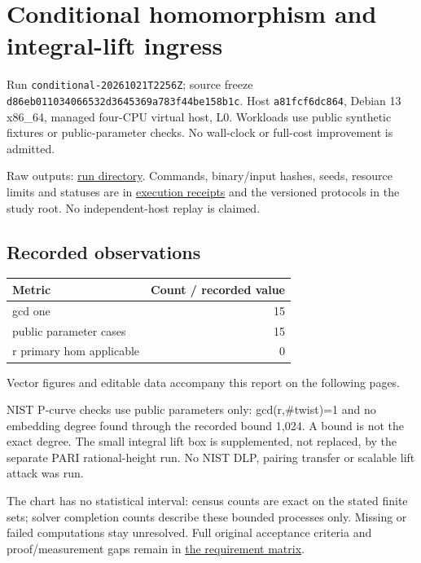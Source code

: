 \documentclass[
  10pt,
  letterpaper,
  landscape]{article}
\author{}
\date{}
\begin{document}
\section{Conditional homomorphism and integral-lift
ingress}\label{conditional-homomorphism-and-integral-lift-ingress}

Run \texttt{conditional-20261021T2256Z}; source freeze
\texttt{d86eb011034066532d3645369a783f44be158b1c}. Host
\texttt{a81fcf6dc864}, Debian 13 x86\_64, managed four-CPU virtual host,
L0. Workloads use public synthetic fixtures or public-parameter checks.
No wall-clock or full-cost improvement is admitted.

Raw outputs:
\href{../../../execution-v1/runs/conditional-20261021T2256Z/}{run
directory}. Commands, binary/input hashes, seeds, resource limits and
statuses are in \href{../../../execution-v1/}{execution receipts} and
the versioned protocols in the study root. No independent-host replay is
claimed.

\subsection{Recorded observations}\label{recorded-observations}

\begin{longtable}[]{@{}lr@{}}
\toprule\noalign{}
Metric & Count / recorded value \\
\midrule\noalign{}
\endhead
\bottomrule\noalign{}
\endlastfoot
gcd one & 15 \\
public parameter cases & 15 \\
r primary hom applicable & 0 \\
\end{longtable}

Vector figures and editable data accompany this report on the following pages.

NIST P-curve checks use public parameters only: gcd(r,\#twist)=1 and no
embedding degree found through the recorded bound 1,024. A bound is not
the exact degree. The small integral lift box is supplemented, not
replaced, by the separate PARI rational-height run. No NIST DLP, pairing
transfer or scalable lift attack was run.

The chart has no statistical interval: census counts are exact on the
stated finite sets; solver completion counts describe these bounded
processes only. Missing or failed computations stay unresolved. Full
original acceptance criteria and proof/measurement gaps remain in
\href{../../../EXPERIMENTS.md}{the requirement matrix}.
\end{document}
